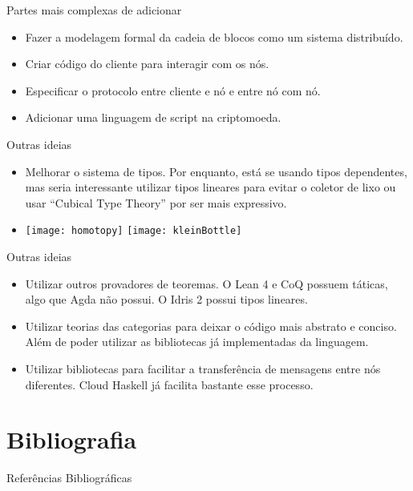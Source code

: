 \documentclass{beamer}
\begin{document}
\begin{frame}{Partes mais complexas de adicionar}
  \begin{itemize}
    \item Fazer a modelagem formal da cadeia de blocos como um sistema distribuído.
    \item Criar código do cliente para interagir com os nós.
    \item Especificar o protocolo entre cliente e nó e entre nó com nó.
    \item Adicionar uma linguagem de script na criptomoeda.
  \end{itemize}
\end{frame}

\begin{frame}{Outras ideias}
  \begin{itemize}
    \item Melhorar o sistema de tipos.
    Por enquanto, está se usando tipos dependentes, mas seria interessante utilizar tipos lineares
    para evitar o coletor de lixo ou usar \foreignquote{english}{Cubical Type Theory} por ser mais expressivo.
  \item
    \texttt{[image: homotopy]}
    \texttt{[image: kleinBottle]}
  \end{itemize}
\end{frame}

\begin{frame}{Outras ideias}
  \begin{itemize}
  \item  Utilizar outros provadores de teoremas.
    O Lean 4 e CoQ possuem táticas, algo que Agda não possui.
    O Idris 2 possui tipos lineares. 
  \item Utilizar teorias das categorias para deixar o código mais abstrato e conciso.
    Além de poder utilizar as bibliotecas já implementadas da linguagem.
  \item Utilizar bibliotecas para facilitar a transferência de mensagens entre nós diferentes.
    Cloud Haskell já facilita bastante esse processo.
  \end{itemize}
\end{frame}


\section{Bibliografia}

\begin{frame}{Referências Bibliográficas}
  
  
\end{frame}
\end{document}
